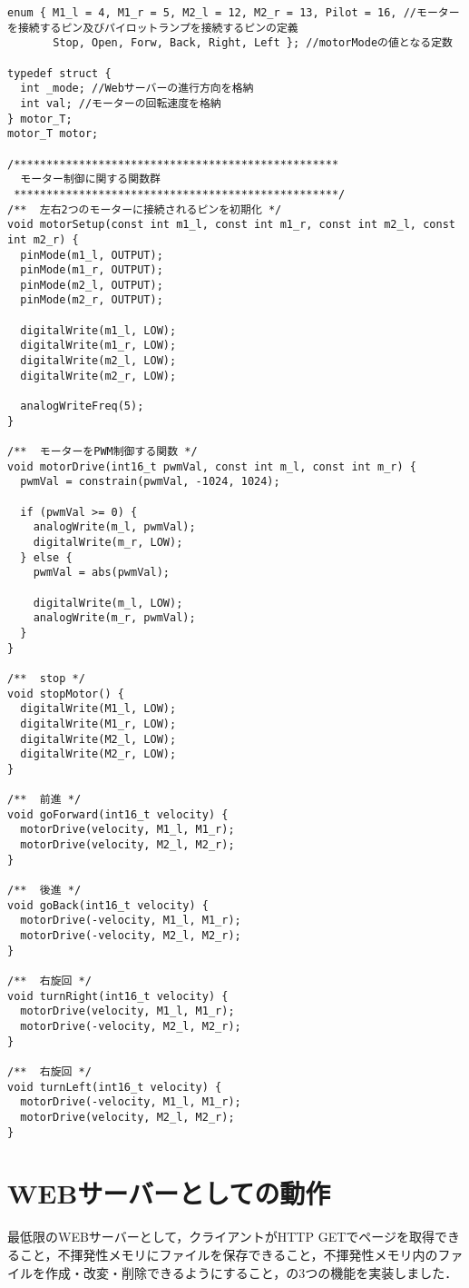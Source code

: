\begin{verbatim}
enum { M1_l = 4, M1_r = 5, M2_l = 12, M2_r = 13, Pilot = 16, //モーターを接続するピン及びパイロットランプを接続するピンの定義
       Stop, Open, Forw, Back, Right, Left }; //motorModeの値となる定数

typedef struct {
  int _mode; //Webサーバーの進行方向を格納
  int val; //モーターの回転速度を格納
} motor_T;
motor_T motor;

/**************************************************
  モーター制御に関する関数群
 **************************************************/
/**  左右2つのモーターに接続されるピンを初期化 */
void motorSetup(const int m1_l, const int m1_r, const int m2_l, const int m2_r) {
  pinMode(m1_l, OUTPUT);
  pinMode(m1_r, OUTPUT);
  pinMode(m2_l, OUTPUT);
  pinMode(m2_r, OUTPUT);

  digitalWrite(m1_l, LOW);
  digitalWrite(m1_r, LOW);
  digitalWrite(m2_l, LOW);
  digitalWrite(m2_r, LOW);

  analogWriteFreq(5);
}

/**  モーターをPWM制御する関数 */
void motorDrive(int16_t pwmVal, const int m_l, const int m_r) {
  pwmVal = constrain(pwmVal, -1024, 1024);

  if (pwmVal >= 0) {
    analogWrite(m_l, pwmVal);
    digitalWrite(m_r, LOW);
  } else {
    pwmVal = abs(pwmVal);

    digitalWrite(m_l, LOW);
    analogWrite(m_r, pwmVal);
  }
}

/**  stop */
void stopMotor() {
  digitalWrite(M1_l, LOW);
  digitalWrite(M1_r, LOW);
  digitalWrite(M2_l, LOW);
  digitalWrite(M2_r, LOW);
}

/**  前進 */
void goForward(int16_t velocity) {
  motorDrive(velocity, M1_l, M1_r);
  motorDrive(velocity, M2_l, M2_r);
}

/**  後進 */
void goBack(int16_t velocity) {
  motorDrive(-velocity, M1_l, M1_r);
  motorDrive(-velocity, M2_l, M2_r);
}

/**  右旋回 */
void turnRight(int16_t velocity) {
  motorDrive(velocity, M1_l, M1_r);
  motorDrive(-velocity, M2_l, M2_r);
}

/**  右旋回 */
void turnLeft(int16_t velocity) {
  motorDrive(-velocity, M1_l, M1_r);
  motorDrive(velocity, M2_l, M2_r);
}
\end{verbatim}

\section{WEBサーバーとしての動作}
最低限のWEBサーバーとして，クライアントがHTTP GETでページを取得できること，不揮発性メモリにファイルを保存できること，不揮発性メモリ内のファイルを作成・改変・削除できるようにすること，の3つの機能を実装しました．
